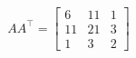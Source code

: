 \documentclass[preview]{standalone}
\begin{document}
\begin{align*}
AA^\top=\left[\begin{matrix}6&11&1\\11&21&3\\1&3&2\end{matrix}\right]
\end{align*}
\end{document}
